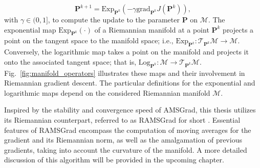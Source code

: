 \begin{equation}
	\bm{P}^{k+1}= \text{Exp}_{\bm{P}^k}\left(-\gamma \text{grad}_{\bm{P}^k}J(\bm{P}^k)\right),
\end{equation} 
with $ \gamma \in (0,1]$, to compute the update to the parameter $\bm{P}$ on $\mathcal{M}$. The exponential map $ \text{Exp}_{\bm{P}^k}\left(\cdot\right)$ of a Riemannian manifold at a point $\bm{P}^k$ projects a point on the tangent space to the manifold space; i.e., $ \text{Exp}_{\bm{P}^k}: \mathcal{T}_{\bm{P}^k}\mathcal{M}\rightarrow \mathcal{M}$. Conversely, the logarithmic map takes a point on the manifold and projects it onto the associated tangent space; that is, $ \text{Log}_{\bm{P}^k}: \mathcal{M}\rightarrow \mathcal{T}_{\bm{P}^k}\mathcal{M}$. Fig.~\ref{fig:manifold_operators} illustrates these maps and their involvement in Riemannian gradient descent. The particular definitions for the exponential and logarithmic maps depend on the considered Riemannian manifold $\mathcal{M}$.


Inspired by the stability and convergence speed of AMSGrad, this thesis utilizes its Riemannian counterpart, referred to as RAMSGrad for short \cite{Becigneul2018Riemannianadaptiveoptimization}. Essential features of RAMSGrad encompass the computation of moving averages for the gradient and its Riemannian norm, as well as the amalgamation of previous gradients, taking into account the curvature of the manifold. A more detailed discussion of this algorithm will be provided in the upcoming chapter.


